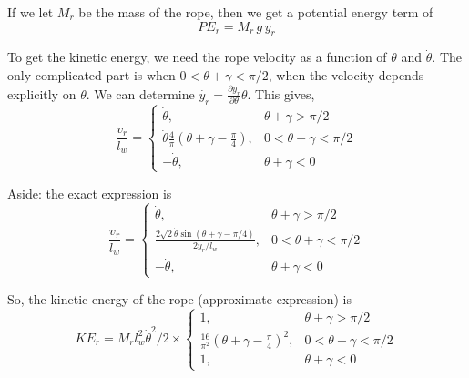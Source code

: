 \documentclass{article}
\begin{document}
If we let $M_r$ be the mass of the rope, then we get a potential energy term of
\begin{equation}
PE_r = M_r \, g \, y_r
\end{equation}

To get the kinetic energy, we need the rope velocity as a function of $\theta$ and $\dot{\theta}$.
The only complicated part is when $0 < \theta+\gamma < \pi/2$, when the velocity depends explicitly on $\theta$.
We can determine $\dot{y_r} = \frac{\partial y_r}{\partial \theta} \dot{\theta}$. This gives,
\begin{equation}
  \frac{v_r}{l_w} = \begin{cases}
    \dot{\theta}, & \theta+\gamma > \pi/2 \\
    \dot{\theta} \frac{4}{\pi}(\theta+\gamma - \frac{\pi}{4}), & 0 < \theta+\gamma < \pi/2 \\
    -\dot{\theta}, & \theta+\gamma < 0
  \end{cases}
\label{eq:RopeVelocityApprix}
\end{equation}

Aside: the exact expression is
\begin{equation}
  \frac{v_r}{l_w} = \begin{cases}
    \dot{\theta}, & \theta+\gamma > \pi/2 \\
    \frac{2\sqrt{2} \dot{\theta} \sin(\theta+\gamma-\pi/4)}{2 y_r / l_w}, & 0 < \theta+\gamma < \pi/2 \\
    -\dot{\theta}, & \theta+\gamma < 0
  \end{cases}
\label{eq:RopeVelocityExact}
\end{equation}

So, the kinetic energy of the rope (approximate expression) is
\begin{equation}
  KE_r = M_r l_w^2 \dot{\theta}^2/2 \times \begin{cases}
    1, & \theta+\gamma > \pi/2  \\
    \frac{16}{\pi^2}(\theta+\gamma - \frac{\pi}{4})^2, & 0 < \theta+\gamma < \pi/2 \\
    1, &  \theta+\gamma< 0
  \end{cases}
\end{equation}
\end{document}
